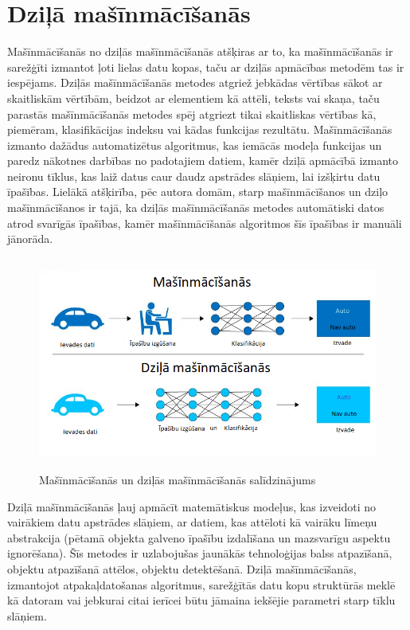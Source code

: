 \section{Dziļā mašīnmācīšanās}
Mašīnmācīšanās no dziļās mašīnmācīšanās atšķiras ar to, ka mašīnmācīšanās ir sarežģīti izmantot ļoti lielas datu kopas, taču ar dziļās apmācības metodēm tas ir iespējams. Dziļās mašīnmācīšanās metodes atgriež jebkādas vērtības sākot ar skaitliskām vērtībām, beidzot ar elementiem kā attēli, teksts vai skaņa, taču parastās mašīnmācīšanās metodes spēj atgriezt tikai skaitliskas vērtības kā, piemēram, klasifikācijas indeksu vai kādas funkcijas rezultātu. Mašīnmācīšanās izmanto dažādus automatizētus algoritmus, kas iemācās modeļa funkcijas un paredz nākotnes darbības no padotajiem datiem, kamēr dziļā apmācībā izmanto neironu tīklus, kas laiž datus caur daudz apstrādes slāņiem, lai izšķirtu datu īpašības. Lielākā atšķirība, pēc autora domām, starp mašīnmācīšanos un dziļo mašīnmācīšanos ir tajā, ka dziļās mašīnmācīšanās metodes automātiski datos atrod svarīgās īpašības, kamēr mašīnmācīšanās algoritmos šīs īpašības ir manuāli jānorāda. 
\begin{figure}[h]%
	\centering
	\includegraphics[height=7cm]{images/deeplearning.png} %
	\caption{Mašīnmācīšanās un dziļās mašīnmācīšanās salīdzinājums}%
	\label{fig:example}%
\end{figure}
Dziļā mašīnmācīšanās ļauj apmācīt matemātiskus modeļus, kas izveidoti no vairākiem datu apstrādes slāņiem, ar datiem, kas attēloti kā vairāku līmeņu abstrakcija (pētamā objekta galveno īpašību izdalīšana un mazsvarīgu aspektu ignorēšana). Šīs metodes ir uzlabojušas jaunākās tehnoloģijas balss atpazīšanā, objektu atpazīšanā attēlos, objektu detektēšanā. Dziļā mašīnmācīšanās, izmantojot atpakaļdatošanas algoritmus, sarežģītās datu kopu struktūrās meklē kā datoram vai jebkurai citai ierīcei būtu jāmaina iekšējie parametri starp tīklu slāņiem.

